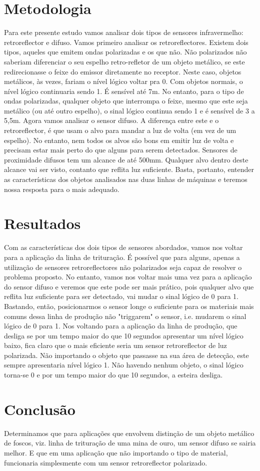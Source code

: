 \documentclass{article}
\begin{document}
\section{Metodologia}
Para este presente estudo vamos analisar dois tipos de sensores infravermelho: retroreflector e difuso. Vamos primeiro analisar os retroreflectores. Existem dois tipos, aqueles que emitem ondas polarizadas e os que não. Não polarizados não saberiam diferenciar o seu espelho retro-refletor de um objeto metálico, se este redirecionasse o feixe do emissor diretamente no receptor. Neste caso, objetos metálicos, às vezes, fariam o nível lógico voltar pra 0. Com objetos normais, o nível lógico continuaria sendo 1. É sensível até 7m. No entanto, para o tipo de ondas polarizadas, qualquer objeto que interrompa o feixe, mesmo que este seja metálico (ou até outro espelho), o sinal lógico continua sendo 1 e é sensível de 3 a 5,5m. 
Agora vamos analisar o sensor difuso. A diferença entre este e o retroreflector, é que usam o alvo para mandar a luz de volta (em vez de um espelho). No entanto, nem todos os alvos são bons em emitir luz de volta e precisam estar mais perto do que alguns para serem detectados. Sensores de proximidade difusos tem um alcance de até 500mm. Qualquer alvo dentro deste alcance vai ser visto, contanto que reflita luz suficiente. 
Basta, portanto, entender as características dos objetos analisados nas duas linhas de máquinas e teremos nossa resposta para o mais adequado.


\section{Resultados}
Com as características dos dois tipos de sensores abordados, vamos nos voltar para a aplicação da linha de trituração. É possível que para alguns, apenas a utilização de sensores retroreflectores não polarizados seja capaz de resolver o problema proposto. No entanto, vamos nos voltar mais uma vez para a aplicação do sensor difuso e veremos que este pode ser mais prático, pois qualquer alvo que reflita luz suficiente para ser detectado, vai mudar o sinal lógico de 0 para 1. Bastando, então, posicionarmos o sensor longe o suficiente para os materiais mais comuns dessa linha de produção não "triggarem" o sensor, i.e. mudarem o sinal lógico de 0 para 1.
Nos voltando para a aplicação da linha de produção, que desliga se por um tempo maior do que 10 segundos apresentar um nível lógico baixo, fica claro que o mais eficiente seria um sensor retroreflector de luz polarizada. Não importando o objeto que passasse na sua área de detecção, este sempre apresentaria nível lógico 1. Não havendo nenhum objeto, o sinal lógico torna-se 0 e por um tempo maior do que 10 segundos, a esteira desliga.
\section{Conclusão}
Determinamos que para aplicações que envolvem distinção de um objeto metálico de foscos, viz. linha de trituração de uma mina de ouro, um sensor difuso se sairia melhor. E que em uma aplicação que não importando o tipo de material, funcionaria simplesmente com um sensor retroreflector polarizado.
\end{document}
